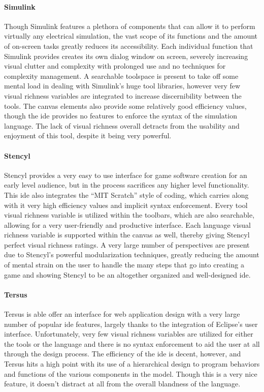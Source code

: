 \paragraph{Simulink} Though Simulink features a plethora of components that
can allow it to perform virtually any electrical simulation, the vast scope
of its functions and the amount of on-screen tasks greatly reduces its
accessibility. Each individual function that Simulink provides creates its
own dialog window on screen, severely increasing visual clutter and
complexity with prolonged use and no techniques for complexity management.
A searchable toolspace is present to take off some mental load in dealing
with Simulink's huge tool libraries, however very few visual richness
variables are integrated to increase discernibility between the tools. The
canvas elements also provide some relatively good efficiency values, though
the \ac{ide} provides no features to enforce the syntax of the simulation
language. The lack of visual richness overall detracts from the usability
and enjoyment of this tool, despite it being very powerful.

\paragraph{Stencyl} Stencyl provides a very easy to use interface for game
software creation for an early level audience, but in the process
sacrifices any higher level functionality. This \ac{ide} also integrates
the ``MIT Scratch'' style of coding, which carries along with it very high
efficiency values and implicit syntax enforcement. Every tool visual
richness variable is utilized within the toolbars, which are also
searchable, allowing for a very user-friendly and productive interface.
Each language visual richness variable is supported within the canvas as
well, thereby giving Stencyl perfect visual richness ratings. A very large
number of perspectives are present due to Stencyl's powerful modularization
techniques, greatly reducing the amount of mental strain on the user to
handle the many steps that go into creating a game and showing Stencyl to
be an altogether organized and well-designed \ac{ide}.

\paragraph{Tersus} Tersus is able offer an interface for web application
design with a very large number of popular \ac{ide} features, largely
thanks to the integration of Eclipse's user interface. Unfortunately, very
few visual richness variables are utilized for either the tools or the
language and there is no syntax enforcement to aid the user at all through
the design process. The efficiency of the \ac{ide} is decent, however, and
Tersus hits a high point with its use of a hierarchical design to program
behaviors and functions of the various components in the model. Though this
is a very nice feature, it doesn't distract at all from the overall
blandness of the language.

